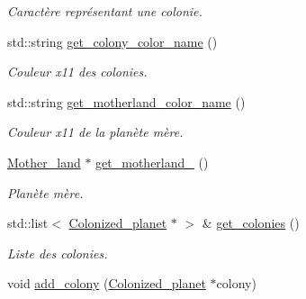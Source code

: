 \begin{DoxyCompactItemize}
\begin{DoxyCompactList}\small\item\em Caractère représentant une colonie. \end{DoxyCompactList}\item 
\hypertarget{classFaction_a2e31e6fb93e25c7bac4a7e3d28ac4169}{std\-::string \hyperlink{classFaction_a2e31e6fb93e25c7bac4a7e3d28ac4169}{get\-\_\-colony\-\_\-color\-\_\-name} ()}\label{classFaction_a2e31e6fb93e25c7bac4a7e3d28ac4169}

\begin{DoxyCompactList}\small\item\em Couleur x11 des colonies. \end{DoxyCompactList}\item 
\hypertarget{classFaction_a4258c106abb09cb851a21980b8fc4996}{std\-::string \hyperlink{classFaction_a4258c106abb09cb851a21980b8fc4996}{get\-\_\-motherland\-\_\-color\-\_\-name} ()}\label{classFaction_a4258c106abb09cb851a21980b8fc4996}

\begin{DoxyCompactList}\small\item\em Couleur x11 de la planète mère. \end{DoxyCompactList}\item 
\hypertarget{classFaction_a4e27a1269e4e34e6abfed1302a9cf7e3}{\hyperlink{classMother__land}{Mother\-\_\-land} $\ast$ \hyperlink{classFaction_a4e27a1269e4e34e6abfed1302a9cf7e3}{get\-\_\-motherland\-\_\-} ()}\label{classFaction_a4e27a1269e4e34e6abfed1302a9cf7e3}

\begin{DoxyCompactList}\small\item\em Planète mère. \end{DoxyCompactList}\item 
\hypertarget{classFaction_a54e816116f2274310608bd6dfcf65dad}{std\-::list$<$ \hyperlink{classColonized__planet}{Colonized\-\_\-planet} $\ast$ $>$ \& \hyperlink{classFaction_a54e816116f2274310608bd6dfcf65dad}{get\-\_\-colonies} ()}\label{classFaction_a54e816116f2274310608bd6dfcf65dad}

\begin{DoxyCompactList}\small\item\em Liste des colonies. \end{DoxyCompactList}\item 
\hypertarget{classFaction_ab5d7a35b69eab9770069c27f2b61d527}{void \hyperlink{classFaction_ab5d7a35b69eab9770069c27f2b61d527}{add\-\_\-colony} (\hyperlink{classColonized__planet}{Colonized\-\_\-planet} $\ast$colony)}\label{classFaction_ab5d7a35b69eab9770069c27f2b61d527}


\end{DoxyCompactItemize}
